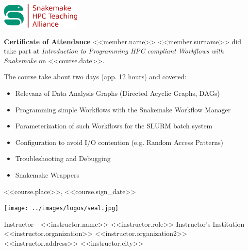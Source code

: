 \documentclass[a4paper,10pt]{article}
\begin{document}
\pagestyle{empty}
\begin{multicols}{2}
 \begin{minipage}{\textwidth}
  \includegraphics[width=4cm]{../images/logos/alliance_logo.png}
 \end{minipage}

 \columnbreak
\end{multicols}


\begin{center}
 \vfill
 \huge{\bf Certificate of Attendance}
 \vfill
 \Large{<<member.name>> <<member.surname>>}
 \vfill
 did take part at 
 \vfill
 \emph{Introduction to Programming HPC compliant Workflows with Snakemake}
 \vfill
 on <<course.date>>.
 \vfill
\end{center}

The course take about two days (app. 12 hours) and covered:
\begin{itemize}
  \item Relevanz of Data Analysis Graphs (Directed Acyclic Graphs, DAGs)
  \item Programming simple Workflows with the Snakemake Workflow Manager
  \item Parameterization of such Workflows for the SLURM batch system
  \item Configuration to avoid I/O contention (e.g. Random Access Patterns)
  \item Troubleshooting and Debugging
  \item Snakemake Wrappers
\end{itemize}

\vfill
<<course.place>>, <<course.sign_date>>

\begin{multicols}{3}
 \begin{minipage}[b][4cm][b]{0.4\textwidth}
   
  
 \end{minipage}%
 \columnbreak
 \begin{minipage}[b][4cm][b]{0.2\textwidth}
 \texttt{[image: ../images/logos/seal.jpg]}
 \end{minipage}%
 \columnbreak
 \begin{flushright}
 \raggedleft
 \begin{minipage}[b][4cm][b]{0.4\textwidth}
     Instructor - <<instructor.name>>\newline
     \footnotesize{<<instructor.role>>}\newline
  \phantom{H}
  Instructor's Institution\newline
  <<instructor.organization>> \newline
  <<instructor.organization2>> \newline
  <<instructor.address>>\newline
  <<instructor.city>>\newline
 \end{minipage}
 \end{flushright}

\end{multicols}
\end{document}
